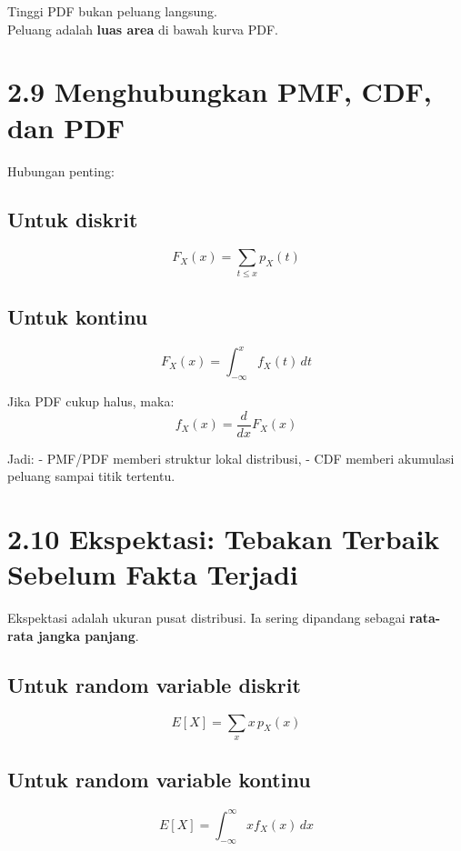 \documentclass[
  letterpaper,
  DIV=11,
  numbers=noendperiod]{scrreprt}
\begin{document}
Tinggi PDF bukan peluang langsung.\\
Peluang adalah \textbf{luas area} di bawah kurva PDF.

\section{2.9 Menghubungkan PMF, CDF, dan
PDF}\label{menghubungkan-pmf-cdf-dan-pdf}

Hubungan penting:

\subsection{Untuk diskrit}\label{untuk-diskrit}

\[
F_X(x)=\sum_{t \le x} p_X(t)
\]

\subsection{Untuk kontinu}\label{untuk-kontinu}

\[
F_X(x)=\int_{-\infty}^{x} f_X(t)\,dt
\]

Jika PDF cukup halus, maka: \[
f_X(x)=\frac{d}{dx}F_X(x)
\]

Jadi: - PMF/PDF memberi struktur lokal distribusi, - CDF memberi
akumulasi peluang sampai titik tertentu.

\section{2.10 Ekspektasi: Tebakan Terbaik Sebelum Fakta
Terjadi}\label{ekspektasi-tebakan-terbaik-sebelum-fakta-terjadi}

Ekspektasi adalah ukuran pusat distribusi. Ia sering dipandang sebagai
\textbf{rata-rata jangka panjang}.

\subsection{Untuk random variable
diskrit}\label{untuk-random-variable-diskrit}

\[
E[X] = \sum_x x\,p_X(x)
\]

\subsection{Untuk random variable
kontinu}\label{untuk-random-variable-kontinu}

\[
E[X] = \int_{-\infty}^{\infty} x f_X(x)\,dx
\]
\end{document}
